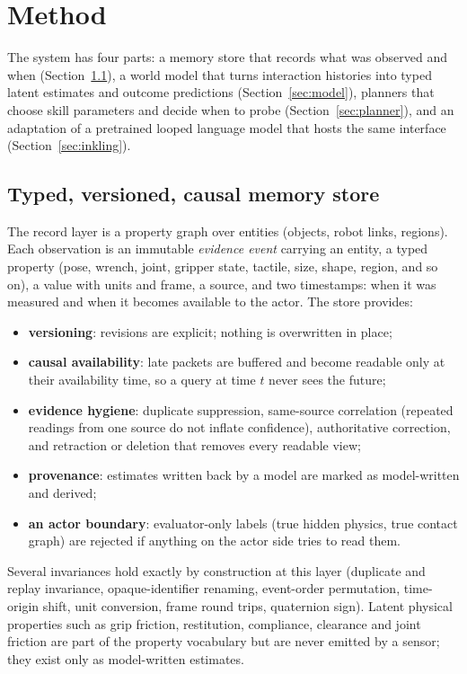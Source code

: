 \section{Method}
\label{sec:method}

The system has four parts: a memory store that records what was observed and when
(Section~\ref{sec:memory}), a world model that turns interaction histories into typed latent estimates and
outcome predictions (Section~\ref{sec:model}), planners that choose skill parameters and decide when to probe
(Section~\ref{sec:planner}), and an adaptation of a pretrained looped language model that hosts the same
interface (Section~\ref{sec:inkling}).

\subsection{Typed, versioned, causal memory store}
\label{sec:memory}

The record layer is a property graph over entities (objects, robot links, regions). Each observation is an
immutable \emph{evidence event} carrying an entity, a typed property (pose, wrench, joint, gripper state,
tactile, size, shape, region, and so on), a value with units and frame, a source, and two timestamps: when
it was measured and when it becomes available to the actor. The store provides:
\begin{itemize}
  \item \textbf{versioning}: revisions are explicit; nothing is overwritten in place;
  \item \textbf{causal availability}: late packets are buffered and become readable only at their availability
        time, so a query at time $t$ never sees the future;
  \item \textbf{evidence hygiene}: duplicate suppression, same-source correlation (repeated readings from one
        source do not inflate confidence), authoritative correction, and retraction or deletion that removes
        every readable view;
  \item \textbf{provenance}: estimates written back by a model are marked as model-written and derived;
  \item \textbf{an actor boundary}: evaluator-only labels (true hidden physics, true contact graph) are rejected
        if anything on the actor side tries to read them.
\end{itemize}
Several invariances hold exactly by construction at this layer (duplicate and replay invariance, opaque-identifier
renaming, event-order permutation, time-origin shift, unit conversion, frame round trips, quaternion sign).
Latent physical properties such as grip friction, restitution, compliance, clearance and joint friction are part
of the property vocabulary but are never emitted by a sensor; they exist only as model-written estimates.

